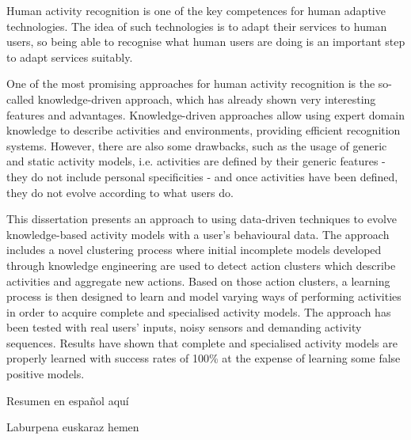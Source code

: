 




\begin{abstracts}        %

Human activity recognition is one of the key competences for human adaptive technologies. The idea of such technologies is to adapt their services to human users, so being able to recognise what human users are doing is an important step to adapt services suitably. 

One of the most promising approaches for human activity recognition is the so-called knowledge-driven approach, which has already shown very interesting features and advantages. Knowledge-driven approaches allow using expert domain knowledge to describe activities and environments, providing efficient recognition systems. However, there are also some drawbacks, such as the usage of generic and static activity models, i.e. activities are defined by their generic features - they do not include personal specificities - and once activities have been defined, they do not evolve according to what users do.

This dissertation presents an approach to using data-driven techniques to evolve knowledge-based activity models with a user's behavioural data. The approach includes a novel clustering process where initial incomplete models developed through knowledge engineering are used to detect action clusters which describe activities and aggregate new actions. Based on those action clusters, a learning process is then designed to learn and model varying ways of performing activities in order to acquire complete and specialised activity models. The approach has been tested with real users' inputs, noisy sensors and demanding activity sequences. Results have shown that complete and specialised activity models are properly learned with success rates of 100\% at the expense of learning some false positive models.

\end{abstracts}

\begin{resumen}        %

Resumen en espa\~nol aqu\'i


\end{resumen}

\begin{laburpena}        %
 
 Laburpena euskaraz hemen
 
\end{laburpena}





